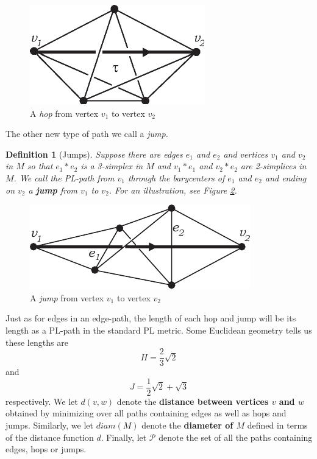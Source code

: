 \documentclass[12pt]{article}
\newtheorem{dfn}[thm]{Definition}
\begin{document}
\begin{figure}
	\centering
		\includegraphics[width=0.28\linewidth]{figures/hops.pdf}
    \caption{A {\em hop} from vertex $v_1$ to vertex $v_2$}
    	\label{fig:hop}
\end{figure}

\noindent The other new type of path we call a {\em jump.}

\begin{dfn}[Jumps] Suppose there are edges $e_1$ and $e_2$ and vertices $v_1$ and $v_2$ in $M$ so that $e_1*e_2$ is a 3-simplex in $M$ and $v_1*e_1$ and $v_2*e_2$ are 2-simplices in $M$. We call the PL-path from $v_1$ through the barycenters of $e_1$ and $e_2$ and ending on $v_2$ a \textbf{jump} from $v_1$ to $v_2$. For an illustration, see Figure \ref{fig:jump}.
\end{dfn}

\begin{figure}
	\centering
		\includegraphics[width=0.36\linewidth]{figures/jump.pdf}
    \caption{A {\em jump} from vertex $v_1$ to vertex $v_2$}
    \label{fig:jump}
\end{figure}

Just as for edges in an edge-path, the length of each hop and jump will be its length as a PL-path in the standard PL metric. Some Euclidean geometry tells us these lengths are \begin{equation} \label{eqn:hop_length} H = \frac{2}{3}\sqrt{2} \end{equation} and \begin{equation} \label{eqn:jump_length} J = \frac{1}{2}\sqrt{2} + \sqrt{3} \end{equation} respectively. We let $d(v,w)$ denote the \textbf{distance between vertices $v$ and $w$} obtained by minimizing over all paths containing edges as well as hops and jumps. Similarly, we let $diam(M)$ denote the \textbf{diameter of $M$} defined in terms of the distance function $d$. Finally, let $\mathcal{P}$ denote the set of all the paths containing edges, hops or jumps.
\end{document}
